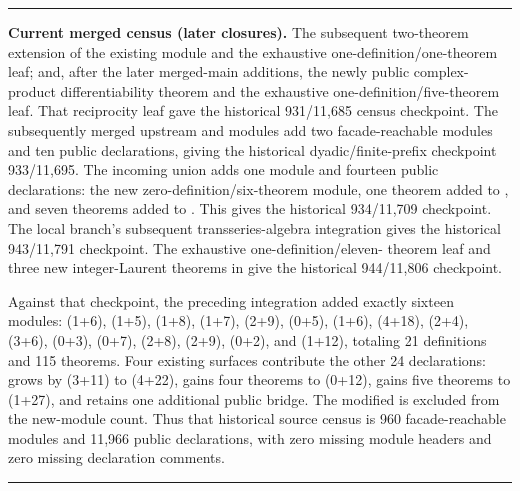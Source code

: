 \documentclass[11pt,oneside]{article}
\theoremstyle{definition}
\theoremstyle{remark}
\newenvironment{boxedremark}{%
  \par\smallskip\noindent\begin{center}\begin{minipage}{0.94\textwidth}%
  \color{black}\hrule\vspace{0.6em}\small
}{%
  \vspace{0.6em}\hrule\end{minipage}\end{center}\smallskip
}
\begin{document}
\begin{boxedremark}
\textbf{Current merged census (later closures).}
The subsequent two-theorem extension of the existing
 module and the exhaustive
one-definition/one-theorem
 leaf; and, after the later
merged-main additions, the newly public complex-product differentiability
theorem and the exhaustive one-definition/five-theorem
 leaf.  That reciprocity leaf
gave the historical 931/11,685 census checkpoint.  The
subsequently merged upstream  and
 modules add two facade-reachable
modules and ten public declarations, giving the historical dyadic/finite-prefix
checkpoint 933/11,695.  The incoming union adds one module and fourteen public
declarations: the new zero-definition/six-theorem
 module, one theorem added to
, and seven theorems added to
.  This gives the historical
934/11,709 checkpoint.  The local branch's subsequent transseries-algebra integration gives
the historical 943/11,791 checkpoint.  The exhaustive one-definition/eleven-
theorem  leaf and three new integer-Laurent
theorems in  give the historical
944/11,806 checkpoint.

Against that checkpoint, the preceding integration added exactly sixteen modules:
 (1+6),
 (1+5),
 (1+8),
 (1+7),
 (2+9),
 (0+5),
 (1+6),
 (4+18),
 (2+4),
 (3+6),
 (0+3),
 (0+7),
 (2+8),
 (2+9),
 (0+2), and
 (1+12), totaling 21 definitions and 115 theorems.
Four existing surfaces contribute the other 24 declarations:
 grows by (3+11) to (4+22),
 gains four theorems to (0+12),
 gains five theorems to (1+27), and
 retains one additional public
bridge.  The modified  is excluded from
the new-module count.  Thus that historical source census is 960 facade-reachable
modules and 11,966 public declarations, with zero missing module headers and
zero missing declaration comments.


\end{boxedremark}
\end{document}
